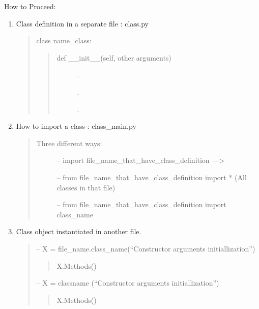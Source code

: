 \documentclass[letterpaper,10pt,english]{sphinxmanual}
\begin{document}
How to Proceed:
\begin{enumerate}
\item {} 
Class definition in a separate file : class.py
\begin{quote}

class name\_class:
\begin{quote}
\begin{description}
\item[{def \_\_init\_\_(self, other arguments)}] \leavevmode
.

.

.

\end{description}
\end{quote}
\end{quote}

\item {} 
How to import a class : class\_main.py
\begin{quote}
\begin{description}
\item[{Three different ways:}] \leavevmode
– import  file\_name\_that\_have\_class\_definition ---\textgreater{} 

– from  file\_name\_that\_have\_class\_definition import * (All classes in that file) 

– from  file\_name\_that\_have\_class\_definition import class\_name 

\end{description}
\end{quote}

\item {} 
Class object instantiated in another file.
\begin{quote}

– X = file\_name.class\_name(“Constructor arguments initiallization”)
\begin{quote}

X.Methods()
\end{quote}

– X = classname (“Constructor arguments initiallization”)
\begin{quote}

X.Methods()
\end{quote}
\end{quote}

\end{enumerate}
\end{document}
